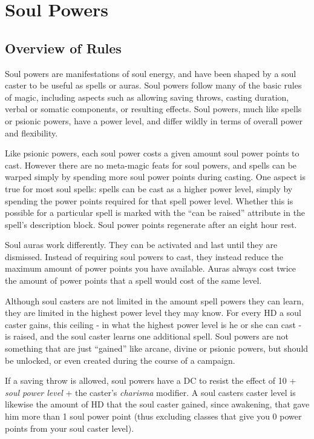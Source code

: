 \section{Soul Powers}
\label{sec:Soul Powers}

\subsection{Overview of Rules}

Soul powers are manifestations of soul energy, and have been shaped by a soul
caster to be useful as spells or auras. Soul powers follow many of the basic
rules of magic, including aspects such as allowing saving throws, casting
duration, verbal or somatic components, or resulting effects. Soul powers,
much like spells or psionic powers, have a power level, and differ wildly in
terms of overall power and flexibility.

Like psionic powers, each soul power costs a given amount soul power points to
cast. However there are no meta-magic feats for soul powers, and spells can be
warped simply by spending more soul power points during casting. One aspect is
true for most soul spells: spells can be cast as a higher power level, simply
by spending the power points required for that spell power level. Whether this
is possible for a particular spell is marked with the ``can be raised''
attribute in the spell's description block. Soul power points regenerate after
an eight hour rest.

Soul auras work differently. They can be activated and last until they are
dismissed. Instead of requiring soul powers to cast, they instead reduce the
maximum amount of power points you have available. Auras always cost twice the
amount of power points that a spell would cost of the same level.

Although soul casters are not limited in the amount spell powers they can
learn, they are limited in the highest power level they may know. For every
HD a soul caster gains, this ceiling - in what the highest power level is he
or she can cast - is raised, and the soul caster learns one additional spell.
Soul powers are not something that are just ``gained'' like arcane, divine
or psionic powers, but should be unlocked, or even created during the course
of a campaign.

If a saving throw is allowed, soul powers have a DC to resist the effect of 10
+ \emph{soul power level} + the caster's \emph{charisma} modifier. A soul
casters caster level is likewise the amount of HD that the soul caster gained,
since awakening, that gave him more than 1 soul power point (thus excluding
classes that give you 0 power points from your soul caster level).

